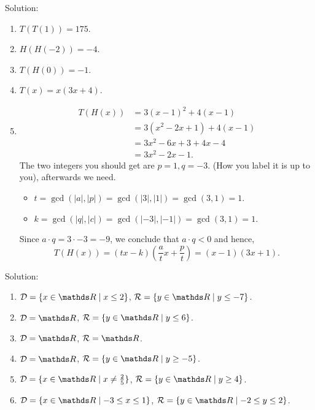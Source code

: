 \documentclass[12pt]{article} %
\begin{document}
\begin{qstn} Solution:
  \begin{enumerate}[label=(\alph*)]
    \item $T(T(1)) = 175$.
    \item $H(H(-2)) = -4$.
    \item $T(H(0)) = -1$. 
    \item $T(x) = x(3x + 4)$.
    \item 
       \begin{align*}
         T(H(x)) &= 3\left( x-1 \right) ^2 + 4\left( x - 1 \right) \\
                 &= 3(x^2 - 2x + 1) + 4(x-1)\\
                 &= 3x^2 - 6x + 3 + 4x - 4\\
                 &= 3x^2 - 2x - 1
      .\end{align*}
      The two integers you should get are $p = 1, q = -3$. (How you label it is up to you), afterwards we need.
       \begin{itemize}
         \item $t = \gcd(\left|a\right|, \left|p\right|) = \gcd(\left|3\right|, \left|1\right|) = \gcd(3,1) = 1$.
         \item $k = \gcd(\left|q\right|, \left|c\right|) = \gcd(\left|-3\right|, \left|-1\right|) = \gcd(3,1) = 1$.
      \end{itemize}
      Since $a \cdot q = 3 \cdot -3 = -9 $, we conclude that $a \cdot q < 0$ and hence,
      \[
            T(H(x)) = (tx - k)\left( \frac{a}{t}x + \frac{p}{t} \right) = (x - 1)(3x + 1)
      .\] 
  \end{enumerate}
\end{qstn}

\newpage

\begin{qstn}
  Solution:
  \begin{enumerate}[label=(\alph*)]
    \item $\mathcal{D} = \{x\in \R \mid x \leq 2\} $, $\mathcal{R} = \{y \in \R \mid y \leq -7\}$.
    \item $\mathcal{D} = \R $, $\mathcal{R} = \{y \in \R \mid y \leq 6\}$.
    \item $\mathcal{D} = \R $, $\mathcal{R} = \R$.
    \item $\mathcal{D} = \R $, $\mathcal{R} = \{ y\in \R \mid y \geq -5\} $.
    \item $\mathcal{D} = \{x\in \R \mid x \neq \frac{2}{5}\}  $, $\mathcal{R} = \{ y\in \R \mid y \geq 4\} $.
    \item $\mathcal{D} = \{x\in \R \mid -3 \leq x \leq 1\}  $, $\mathcal{R} = \{ y\in \R \mid -2 \leq y \leq 2\} $.
  \end{enumerate}
\end{qstn}
\end{document}
